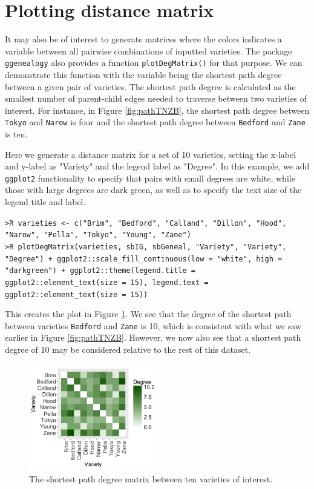 \documentclass[11pt,a4paper,oldfontcommands,openany]{memoir}
\DeclareRobustCommand{\mybox}[2][gray!15]{%
\begin{tcolorbox}[   %
        breakable,
        left=0pt,
        right=0pt,
        top=0pt,
        bottom=0pt,
        colback=#1,
        colframe=#1,
        width=\dimexpr\textwidth\relax, 
        enlarge left by=0mm,
        boxsep=5pt,
        arc=0pt,outer arc=0pt,
        ]
        #2
\end{tcolorbox}
}
\numberwithin{equation}{section} %
\newcommand{\code}[1]{{\texttt{#1}}}
\newcommand{\pkg}[1]{{\texttt{#1}}}
\begin{document}
\section{Plotting distance matrix}

It may also be of interest to generate matrices where the colors indicates a variable between all pairwise combinations of inputted varieties. The package \pkg{ggenealogy} also provides a function \code{plotDegMatrix()} for that purpose. We can demonstrate this function with the variable being the shortest path degree between a given pair of varieties. The shortest path degree is calculated as the smallest number of parent-child edges needed to traverse between two varieties of interest. For instance, in Figure \ref{fig:pathTNZB}, the shortest path degree between \code{Tokyo} and \code{Narow} is four and the shortest path degree between \code{Bedford} and \code{Zane} is ten.

Here we generate a distance matrix for a set of 10 varieties, setting the x-label and y-label as "Variety" and the legend label as "Degree". In this example, we add \pkg{ggplot2} functionality to specify that pairs with small degrees are white, while those with large degrees are dark green, as well as to specify the text size of the legend title and label.

\mybox{
\texttt{>R varieties <- c("Brim", "Bedford", "Calland", "Dillon", "Hood", "Narow", "Pella", "Tokyo", "Young", "Zane")}\\
\texttt{>R plotDegMatrix(varieties, sbIG, sbGeneal, "Variety", "Variety", "Degree") + ggplot2::scale\_fill\_continuous(low = "white", high = "darkgreen") + ggplot2::theme(legend.title = ggplot2::element\_text(size = 15), legend.text = ggplot2::element\_text(size = 15))}
}

This creates the plot in Figure \ref{fig:degMatrix}. We see that the degree of the shortest path between varieties \code{Bedford} and \code{Zane} is 10, which is consistent with what we saw earlier in Figure \ref{fig:pathTNZB}. However, we now also see that a shortest path degree of 10 may be considered relative to the rest of this dataset.

\begin{figure}[h]
    \begin{framed}
    \centering
    \includegraphics[width=0.5\textwidth]{degMatrix}
    \end{framed}
    \caption{The shortest path degree matrix between ten varieties of interest.}
    \label{fig:degMatrix}
\end{figure}
\end{document}

